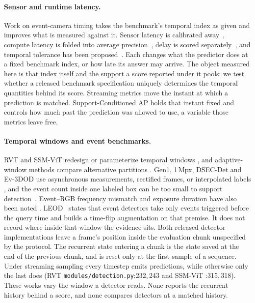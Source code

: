 \documentclass[10pt,twocolumn,letterpaper]{article}
\begin{document}
\paragraph{Sensor and runtime latency.}
Work on event-camera timing takes the benchmark's temporal index as given and improves what is measured against it. Sensor latency is calibrated away~\cite{yang2024latency,liu2024nighttime}, compute latency is folded into average precision~\cite{li2020streaming,yang2022streamyolo,chu2026stare}, delay is scored separately~\cite{mao2019delay}, and temporal tolerance has been proposed~\cite{softed2024}. Each changes what the predictor does at a fixed benchmark index, or how late its answer may arrive. The object measured here is that index itself and the support a score reported under it pools: we test whether a released benchmark specification uniquely determines the temporal quantities behind its score. Streaming metrics move the instant at which a prediction is matched. Support-Conditioned AP holds that instant fixed and controls how much past the prediction was allowed to use, a variable those metrics leave free.

\paragraph{Temporal windows and event benchmarks.}
RVT and SSM-ViT redesign or parameterize temporal windows
\cite{gehrig2023rvt,zubic2024ssm}, and adaptive-window methods compare
alternative partitions \cite{sui2026astw}. Gen1, 1\,Mpx, DSEC-Det and Ev-3DOD use asynchronous measurements, rectified frames, or interpolated labels \cite{detournemire2020gen1,perot2020megapixel,gehrig2024lowlatency,cho2025ev3dod}, and the event count inside one labeled box can be too small to support detection~\cite{kugele2023howmany}. Event--RGB frequency mismatch and exposure duration have also been noted \cite{faod2024,sun2023refid,kim2022unknownexposure}. LEOD~\cite{wu2024leod} states that event detectors take only events triggered before the query time and builds a time-flip augmentation on that premise. It does not record where inside that window the evidence sits. Both released detector implementations leave a frame's position inside the evaluation chunk unspecified by the protocol. The recurrent state entering a chunk is the state saved at the end of the previous chunk, and is reset only at the first sample of a sequence. Under streaming sampling every timestep emits predictions, while otherwise only the last does (RVT \texttt{modules/detection.py}:232,\,243 and SSM-ViT :315,\,318). These works vary the window a detector reads. None reports the recurrent history behind a score, and none compares detectors at a matched history.
\end{document}
